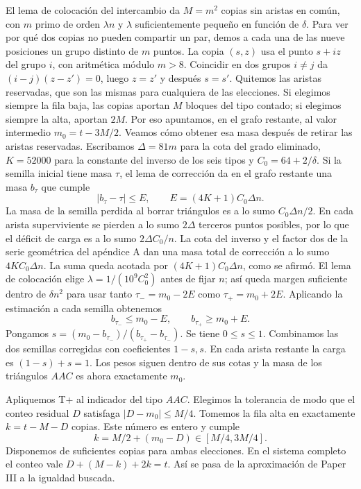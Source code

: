 \documentclass[spanish,11pt,a4paper]{article}
\begin{document}
El lema de colocación del intercambio da \(M=m^2\) copias sin aristas en común, con \(m\) primo de orden \(\lambda n\) y \(\lambda\) suficientemente pequeño en función de \(\delta\). Para ver por qué dos copias no pueden compartir un par, demos a cada una de las nueve posiciones un grupo distinto de \(m\) puntos. La copia \((s,z)\) usa el punto \(s+iz\) del grupo \(i\), con aritmética módulo \(m>8\). Coincidir en dos grupos \(i\ne j\) da \((i-j)(z-z')=0\), luego \(z=z'\) y después \(s=s'\). Quitemos las aristas reservadas, que son las mismas para cualquiera de las elecciones. Si elegimos siempre la fila baja, las copias aportan \(M\) bloques del tipo contado; si elegimos siempre la alta, aportan \(2M\). Por eso apuntamos, en el grafo restante, al valor intermedio \(m_0=t-3M/2\). Veamos cómo obtener esa masa después de retirar las aristas reservadas. Escribamos \(\Delta=81m\) para la cota del grado eliminado, \(K=52000\) para la constante del inverso de los seis tipos y \(C_0=64+2/\delta\). Si la semilla inicial tiene masa \(\tau\), el lema de corrección da en el grafo restante una masa \(b_\tau\) que cumple \[|b_\tau-\tau|\le E,\qquad E=(4K+1)C_0\Delta n.\] La masa de la semilla perdida al borrar triángulos es a lo sumo \(C_0\Delta n/2\). En cada arista superviviente se pierden a lo sumo \(2\Delta\) terceros puntos posibles, por lo que el déficit de carga es a lo sumo \(2\Delta C_0/n\). La cota del inverso y el factor dos de la serie geométrica del apéndice A dan una masa total de corrección a lo sumo \(4KC_0\Delta n\). La suma queda acotada por \((4K+1)C_0\Delta n\), como se afirmó. El lema de colocación elige \(\lambda=1/(10^9 C_0^2)\) antes de fijar \(n\); así queda margen suficiente dentro de \(\delta n^2\) para usar tanto \(\tau_-=m_0-2E\) como \(\tau_+=m_0+2E\). Aplicando la estimación a cada semilla obtenemos \[b_{\tau_-}\le m_0-E,\qquad b_{\tau_+}\ge m_0+E.\] Pongamos \(s=(m_0-b_{\tau_-})/(b_{\tau_+}-b_{\tau_-})\). Se tiene \(0\le s\le1\). Combinamos las dos semillas corregidas con coeficientes \(1-s,s\). En cada arista restante la carga es \((1-s)+s=1\). Los pesos siguen dentro de sus cotas y la masa de los triángulos \(AAC\) es ahora exactamente \(m_0\).

Apliquemos T+ al indicador del tipo \(AAC\). Elegimos la tolerancia de modo que el conteo residual \(D\) satisfaga \(|D-m_0|\le M/4\). Tomemos la fila alta en exactamente \(k=t-M-D\) copias. Este número es entero y cumple \[k=M/2+(m_0-D)\in[M/4,3M/4].\] Disponemos de suficientes copias para ambas elecciones. En el sistema completo el conteo vale \(D+(M-k)+2k=t\). Así se pasa de la aproximación de Paper III a la igualdad buscada.
\end{document}
